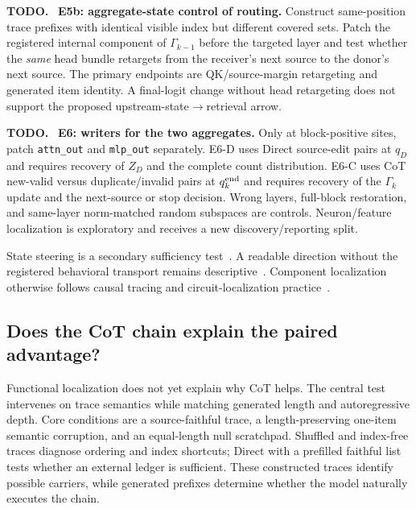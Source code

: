 \documentclass[11pt]{article}
\newenvironment{todobox}
  {\begin{center}\begin{minipage}{0.95\linewidth}\color{todored}\textbf{TODO.}~}
  {\end{minipage}\end{center}}
\begin{document}
\begin{todobox}
\textbf{E5b: aggregate-state control of routing.} Construct same-position trace prefixes with identical visible index but different covered sets. Patch the registered internal component of $\Gamma_{k-1}$ before the targeted layer and test whether the \emph{same} head bundle retargets from the receiver's next source to the donor's next source. The primary endpoints are QK/source-margin retargeting and generated item identity. A final-logit change without head retargeting does not support the proposed upstream-state$\rightarrow$retrieval arrow.
\end{todobox}

\begin{todobox}
\textbf{E6: writers for the two aggregates.} Only at block-positive sites, patch \texttt{attn\_out} and \texttt{mlp\_out} separately. E6-D uses Direct source-edit pairs at $q_D$ and requires recovery of $Z_D$ and the complete count distribution. E6-C uses CoT new-valid versus duplicate/invalid pairs at $q_k^{\rm end}$ and requires recovery of the $\Gamma_k$ update and the next-source or stop decision. Wrong layers, full-block restoration, and same-layer norm-matched random subspaces are controls. Neuron/feature localization is exploratory and receives a new discovery/reporting split.
\end{todobox}

State steering is a secondary sufficiency test~\citep{turner2023actadd}. A readable direction without the registered behavioral transport remains descriptive~\citep{yuan2026hidden}. Component localization otherwise follows causal tracing and circuit-localization practice~\citep{meng2022rome,wang2022ioi,conmy2023acdc}.

\subsection{Does the CoT chain explain the paired advantage?}

Functional localization does not yet explain why CoT helps. The central test intervenes on trace semantics while matching generated length and autoregressive depth. Core conditions are a source-faithful trace, a length-preserving one-item semantic corruption, and an equal-length null scratchpad. Shuffled and index-free traces diagnose ordering and index shortcuts; Direct with a prefilled faithful list tests whether an external ledger is sufficient. These constructed traces identify possible carriers, while generated prefixes determine whether the model naturally executes the chain.
\end{document}
